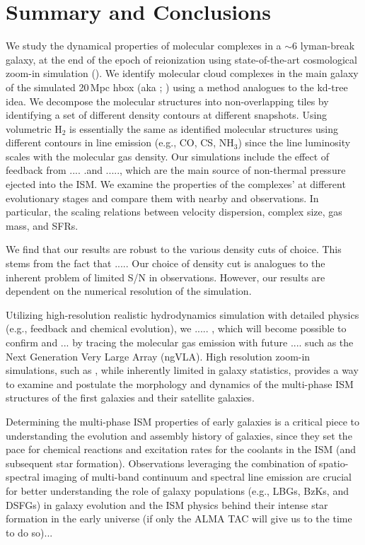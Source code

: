 \documentclass[apj]{emulateapj} %
\begin{document}
\section{Summary and Conclusions}      \label{sec:conclusion}

We study the dynamical properties of molecular complexes in a \z$\sim$6 lyman-break galaxy, 
at the end of the epoch of reionization using state-of-the-art cosmological zoom-in simulation 
(). We identify molecular cloud complexes in the main galaxy of the 
simulated 20\,Mpc h\pmOne box (aka \flower; \citealt{Pallottini17a}) using a method analogues 
to the kd-tree idea. We decompose the molecular structures into non-overlapping tiles 
by identifying a set of different density contours at different snapshots. 
Using volumetric H$_2$ is essentially the same as identified molecular structures using
different contours in line emission (e.g., CO, CS, NH$_3$) 
since the line luminosity scales with the molecular gas density.
Our simulations include the effect of feedback from .... .and ....., which are the main source 
of non-thermal pressure ejected into the ISM.
We examine the properties of the complexes' at different evolutionary stages and compare 
them with nearby and \highz observations. In particular,
the scaling relations between velocity dispersion, complex size, gas mass, 
and SFRs.

We find that our results are robust to the various density cuts of choice. 
This stems from the 
fact that ..... Our choice of density cut is analogues to the inherent problem of limited S/N 
in observations.
However, our results are dependent on the numerical resolution of the simulation. 

Utilizing high-resolution realistic hydrodynamics simulation with 
detailed physics (e.g., feedback and chemical evolution), we 
..... , which will become possible to confirm and ... by tracing 
the molecular gas emission with future .... such as the Next Generation Very Large Array (ngVLA).
High resolution zoom-in simulations, such as , while inherently limited in galaxy 
statistics, provides a way to examine and postulate the morphology and dynamics of  
the multi-phase ISM structures of the first galaxies and their satellite galaxies.

Determining the multi-phase ISM properties of early galaxies 
is a critical piece to understanding the evolution and 
assembly history of galaxies, since they set the pace 
for chemical reactions and excitation rates for the coolants in the ISM (and subsequent star formation). 
Observations leveraging the combination of spatio-spectral imaging of 
multi-band continuum and spectral line emission are crucial for better understanding 
the role of \highz galaxy populations 
(e.g., LBGs, BzKs, and DSFGs) in 
galaxy evolution and the ISM physics behind their intense star formation in the early universe 
(if only the ALMA TAC will give us to the time to do so)...
\end{document}
